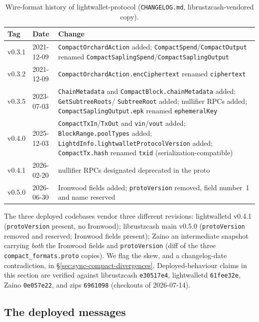 \documentclass[11pt,a4paper]{article}
\theoremstyle{definition}
\begin{document}
\begin{table}[htbp]
\centering\small
\begin{tabular}{@{}llp{8.2cm}@{}}
\toprule
Tag & Date & Change \\
\midrule
v0.3.1 & 2021-12-09 & \texttt{CompactOrchardAction} added;
  \texttt{CompactSpend}/\texttt{CompactOutput} renamed
  \texttt{CompactSaplingSpend}/\texttt{CompactSaplingOutput} \\
v0.3.2 & 2021-12-09 & \texttt{CompactOrchardAction.encCiphertext} renamed
  \texttt{ciphertext} \\
v0.3.5 & 2023-07-03 & \texttt{ChainMetadata} and
  \texttt{CompactBlock.chainMetadata} added; \texttt{GetSubtreeRoots}/%
  \texttt{SubtreeRoot} added; nullifier RPCs added;
  \texttt{CompactSaplingOutput.epk} renamed \texttt{ephemeralKey} \\
v0.4.0 & 2025-12-03 & \texttt{CompactTxIn}/\texttt{TxOut} and
  \texttt{vin}/\texttt{vout} added; \texttt{BlockRange.poolTypes} added;
  \texttt{LightdInfo.lightwalletProtocolVersion} added;
  \texttt{CompactTx.hash} renamed \texttt{txid}
  (serialization-compatible) \\
v0.4.1 & 2026-02-20 & nullifier RPCs designated deprecated in the
  proto \\
v0.5.0 & 2026-06-30 & Ironwood fields added; \texttt{protoVersion} removed,
  field number~1 and name reserved \\
\bottomrule
\end{tabular}
\caption{Wire-format history of \textsf{lightwallet-protocol}
(\texttt{CHANGELOG.md}, librustzcash-vendored copy).}%
\label{tab:sync-lwp-history}
\end{table}

The three deployed codebases vendor three different revisions:
\textsf{lightwalletd} v0.4.1 (\texttt{protoVersion} present, no Ironwood);
\textsf{librustzcash} main v0.5.0 (\texttt{protoVersion} removed and
reserved; Ironwood fields present); \textsf{Zaino} an intermediate snapshot
carrying \emph{both} the Ironwood fields and \texttt{protoVersion} (diff of
the three \texttt{compact\_formats.proto} copies). We flag the skew, and a
changelog-date contradiction, in \S\ref{sec:sync-compact-divergences}.
Deployed-behaviour claims in this section are verified against
\textsf{librustzcash} \texttt{e30517e4}, \textsf{lightwalletd}
\texttt{61fee32e}, \textsf{Zaino} \texttt{0e057e22}, and \textsf{zips}
\texttt{6961098} (checkouts of 2026-07-14).

\subsection{The deployed messages}\label{sec:sync-compact-wire}
\end{document}
